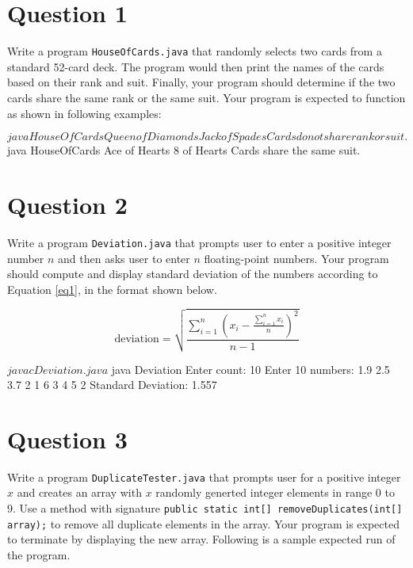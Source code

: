 \section*{Question 1}
Write a program \texttt{HouseOfCards.java} that randomly selects two cards from a standard 52-card deck.
The program would then print the names of the cards based on their rank and suit.
Finally, your program should determine if the two cards share the same rank or the same suit.
Your program is expected to function as shown in following examples:

\begin{terminal}
$ java HouseOfCards
Queen of Diamonds
Jack of Spades
Cards do not share rank or suit.
$ java HouseOfCards
Ace of Hearts
8 of Hearts
Cards share the same suit.
\end{terminal}

\newpage

\section*{Question 2}
Write a program \texttt{Deviation.java} that prompts user to enter a positive integer number $n$ and then asks user to enter $n$ floating-point numbers.
Your program should compute and display standard deviation of the numbers according to Equation \ref{eq1}, in the format shown below.

\begin{equation}
\text{deviation} = \sqrt{\frac{\sum_{i = 1}^{n} \left( x_i - \frac{\sum_{i = 1}^{n} x_i}{n} \right)^2 }{n - 1}}
\label{eq1}
\end{equation}

\begin{terminal}
$ javac Deviation.java
$ java Deviation
Enter count: 10
Enter 10 numbers: 1.9 2.5 3.7 2 1 6 3 4 5 2
Standard Deviation: 1.557
\end{terminal}

\section*{Question 3}
Write a program \texttt{DuplicateTester.java} that prompts user for a positive integer $x$ and creates an array with $x$ randomly generted integer elements in range 0 to 9.
Use a method with signature \texttt{public static int[] removeDuplicates(int[] array);} to remove all duplicate elements in the array.
Your program is expected to terminate by displaying the new array.
Following is a sample expected run of the program.

